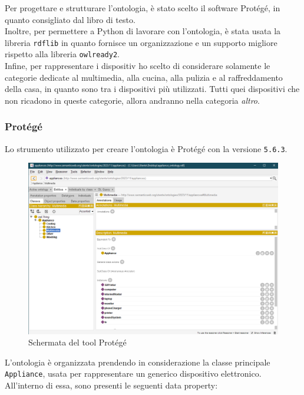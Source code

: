 \documentclass[12pt, letterpaper]{article}
\begin{document}
\noindent Per progettare e strutturare l'ontologia, è stato scelto il software Protégé, in quanto
consigliato dal libro di testo. \\

\noindent Inoltre, per permettere a Python di lavorare con l'ontologia, è stata usata la libreria \texttt{rdflib}
in quanto fornisce un organizzazione e un supporto migliore rispetto alla libreria \texttt{owlready2}. \\

\noindent Infine, per rappresentare i dispositiv ho scelto di considerare solamente le categorie dedicate al
multimedia, alla cucina, alla pulizia e al raffreddamento della casa, in quanto sono tra i dispositivi più
utilizzati. Tutti quei dispositivi che non ricadono in queste categorie, allora andranno nella
categoria \textit{altro}.

\subsubsection{Protégé}

Lo strumento utilizzato per creare l'ontologia è Protégé \cite{protege} con la versione
\texttt{5.6.3}.

\begin{figure}[h]
      \centering
      \includegraphics[scale=0.4]{protege-home.png}
      \caption{Schermata del tool Protégé}
\end{figure}

\noindent L'ontologia è organizzata prendendo in considerazione la classe
principale \texttt{Appliance}, usata per rappresentare un generico dispositivo elettronico.
All'interno di essa, sono presenti le seguenti data property:
\end{document}
